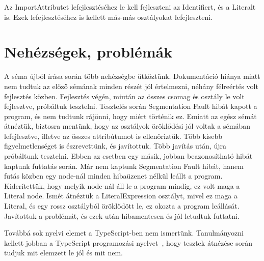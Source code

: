 Az ImportAttributet lefejlesztéséhez le kell fejleszteni az Identifiert, és a Literalt is.
Ezek lefejlesztéséhez is kellett más-más osztályokat lefejleszteni.

\noindent

\section{Nehézségek, problémák}

\noindent

A séma újból írása során több nehézségbe ütköztünk.
Dokumentáció hiánya miatt nem tudtuk az előző sémának minden részét jól értelmezni, néhány félreértés volt fejlesztés közben.
Fejlesztés végén, miután az összes csomag és osztály le volt fejlesztve, próbáltuk tesztelni.
Tesztelés során Segmentation Fault hibát kapott a program, és nem tudtunk rájönni, hogy miért történik ez.
Emiatt az egész sémát átnéztük, biztosra mentünk, hogy az osztályok öröklődési jól voltak a sémában lefejlesztve, illetve az összes attribútumot is ellenőriztük.
Több kisebb figyelmetlenséget is észrevettünk, és javítottuk.
Több javítás után, újra próbáltunk tesztelni. Ebben az esetben egy másik, jobban beazonosítható hibát kaptunk futtatás során.
Már nem kaptunk Segmentation Fault hibát, hanem futás közben egy node-nál minden hibaüzenet nélkül leállt a program.
Kiderítettük, hogy melyik node-nál áll le a program mindig, ez volt maga a Literal node.
Ismét átnéztük a LiteralExpression osztályt, mivel ez maga a Literal, és egy rossz osztályból öröklődött le, ez okozta a program leállását.
Javítottuk a problémát, és ezek után hibamentesen és jól letudtuk futtatni.

\noindent

Továbbá sok nyelvi elemet a TypeScript-ben nem ismertünk.
Tanulmányozni kellett jobban a TypeScript programozási nyelvet~\cite{fenton2014pro, cherny2019programming, nance2014typescript, 10.1007/978-3-662-44202-9_11}, hogy tesztek átnézése során tudjuk mit elemzett le jól és mit nem.
